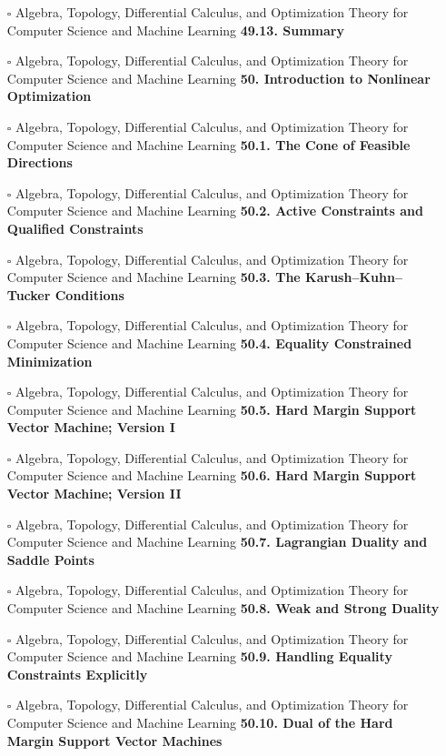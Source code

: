 \documentclass[a4, landscape, 12pt]{article}
\newcommand{\checkbox}{$\square$}%
\begin{document}
\begin{itemize}
{}
\item [\checkbox]  Algebra, Topology, Differential Calculus, and Optimization Theory for Computer Science and Machine Learning \textbf{ 49.13. Summary
}
\item [\checkbox]  Algebra, Topology, Differential Calculus, and Optimization Theory for Computer Science and Machine Learning \textbf{ 50. Introduction to Nonlinear Optimization
}
\item [\checkbox]  Algebra, Topology, Differential Calculus, and Optimization Theory for Computer Science and Machine Learning \textbf{ 50.1. The Cone of Feasible Directions
}
\item [\checkbox]  Algebra, Topology, Differential Calculus, and Optimization Theory for Computer Science and Machine Learning \textbf{ 50.2. Active Constraints and Qualified Constraints
}
\item [\checkbox]  Algebra, Topology, Differential Calculus, and Optimization Theory for Computer Science and Machine Learning \textbf{ 50.3. The Karush–Kuhn–Tucker Conditions
}
\item [\checkbox]  Algebra, Topology, Differential Calculus, and Optimization Theory for Computer Science and Machine Learning \textbf{ 50.4. Equality Constrained Minimization
}
\item [\checkbox]  Algebra, Topology, Differential Calculus, and Optimization Theory for Computer Science and Machine Learning \textbf{ 50.5. Hard Margin Support Vector Machine; Version I
}
\item [\checkbox]  Algebra, Topology, Differential Calculus, and Optimization Theory for Computer Science and Machine Learning \textbf{ 50.6. Hard Margin Support Vector Machine; Version II
}
\item [\checkbox]  Algebra, Topology, Differential Calculus, and Optimization Theory for Computer Science and Machine Learning \textbf{ 50.7. Lagrangian Duality and Saddle Points
}
\item [\checkbox]  Algebra, Topology, Differential Calculus, and Optimization Theory for Computer Science and Machine Learning \textbf{ 50.8. Weak and Strong Duality
}
\item [\checkbox]  Algebra, Topology, Differential Calculus, and Optimization Theory for Computer Science and Machine Learning \textbf{ 50.9. Handling Equality Constraints Explicitly
}
\item [\checkbox]  Algebra, Topology, Differential Calculus, and Optimization Theory for Computer Science and Machine Learning \textbf{ 50.10. Dual of the Hard Margin Support Vector Machines
}
\end{itemize}
\end{document}
